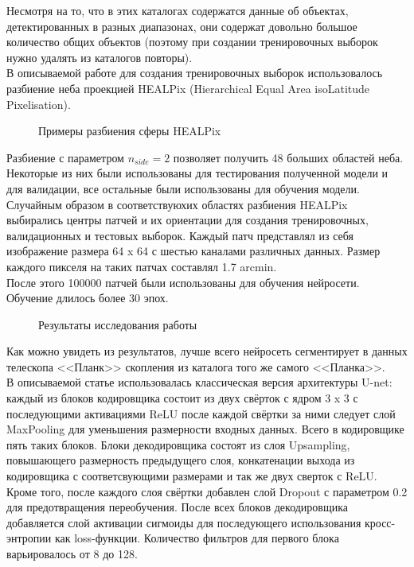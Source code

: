 Несмотря на то, что в этих каталогах содержатся данные об объектах, детектированных в разных 
диапазонах, они содержат довольно большое количество общих объектов (поэтому при создании 
тренировочных выборок нужно удалять из каталогов повторы). \\

В описываемой работе для создания тренировочных выборок использовалось разбиение неба проекцией 
HEALPix (Hierarchical Equal Area isoLatitude Pixelisation). \\
\begin{figure}[h]
	\caption{Примеры разбиения сферы HEALPix \cite{Healpix}}
\end{figure}

Разбиение с параметром $n_{side}=2$ позволяет получить 48 больших областей неба. Некоторые из них 
были использованы для тестирования полученной модели и для валидации, все остальные были 
использованы для обучения модели.\\ 

Случайным образом в соответствуюхих областях разбиения HEALPix выбирались центры патчей и их 
ориентации для создания тренировочных, валидационных и тестовых выборок. Каждый патч представлял 
из себя изображение размера 64 x 64 с шестью каналами различных данных. Размер каждого пикселя 
на таких патчах составлял 1.7 arcmin. \\

После этого 100000 патчей были использованы для обучения нейросети. Обучение длилось более 30 эпох. \\ 
\begin{figure}[h!]
	\center{\texttt{[image: sz0]}}
	\caption{Результаты исследования работы \cite{Bonjean}}
\end{figure}

Как можно увидеть из результатов, лучше всего нейросеть сегментирует в данных телескопа <<Планк>> 
скопления из каталога того же самого <<Планка>>.\\

В описываемой статье использовалась классическая версия архитектуры U-net: каждый из блоков 
кодировщика состоит из двух свёрток с ядром 3 x 3 с последующими активациями ReLU после каждой 
свёртки за ними следует слой MaxPooling для уменьшения размерности входных данных. Всего в 
кодировщике пять таких блоков. Блоки декодировщика состоят из слоя Upsampling, повышающего 
размерность предыдущего слоя, конкатенации выхода из кодировщика с соответсвующими размерами и 
так же двух сверток с ReLU. Кроме того, после каждого слоя свёртки добавлен слой Dropout с 
параметром 0.2 для предотвращения переобучения. После всех блоков декодировщика добавляется слой 
активации сигмоиды для последующего использования кросс-энтропии как loss-функции. Количество 
фильтров для первого блока варьировалось от 8 до 128.\\

